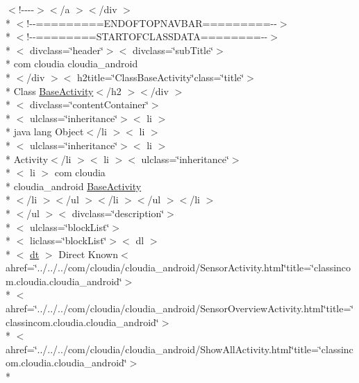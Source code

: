 \begin{DoxyCompactItemize}
$<$!-\/-\/-\/-\/$>$$<$/a $>$$<$/div $>$\\*
$<$!-\/-\/=========E\-N\-D\-O\-F\-T\-O\-P\-N\-A\-V\-B\-A\-R=========-\/-\/$>$\\*
$<$!-\/-\/========S\-T\-A\-R\-T\-O\-F\-C\-L\-A\-S\-S\-D\-A\-T\-A========-\/-\/$>$\\*
$<$ divclass=\char`\"{}header\char`\"{}$>$$<$ divclass=\char`\"{}sub\-Title\char`\"{}$>$\\*
 com cloudia cloudia\-\_\-android\\*
$<$/div $>$$<$ h2title=\char`\"{}Class\-Base\-Activity\char`\"{}class=\char`\"{}title\char`\"{}$>$\\*
 Class \hyperlink{index-2_8html_a61e95a6a9edfa0964ff3438abd1581e4}{Base\-Activity}$<$/h2 $>$$<$/div $>$\\*
$<$ divclass=\char`\"{}content\-Container\char`\"{}$>$\\*
$<$ ulclass=\char`\"{}inheritance\char`\"{}$>$$<$ li $>$\\*
 java lang Object$<$/li $>$$<$ li $>$\\*
$<$ ulclass=\char`\"{}inheritance\char`\"{}$>$$<$ li $>$\\*
 Activity$<$/li $>$$<$ li $>$$<$ ulclass=\char`\"{}inheritance\char`\"{}$>$\\*
$<$ li $>$ com cloudia \\*
cloudia\-\_\-android \hyperlink{index-2_8html_a61e95a6a9edfa0964ff3438abd1581e4}{Base\-Activity}\\*
$<$/li $>$$<$/ul $>$$<$/li $>$$<$/ul $>$$<$/li $>$\\*
$<$/ul $>$$<$ divclass=\char`\"{}description\char`\"{}$>$\\*
$<$ ulclass=\char`\"{}block\-List\char`\"{}$>$\\*
$<$ liclass=\char`\"{}block\-List\char`\"{}$>$$<$ dl $>$\\*
$<$ \hyperlink{stylesheet_8css_a107565fb4039d33b041380d6e0ea1d80}{dt} $>$ Direct Known$<$ ahref=\char`\"{}../../../com/cloudia/cloudia\-\_\-android/Sensor\-Activity.\-html\char`\"{}title=\char`\"{}classincom.\-cloudia.\-cloudia\-\_\-android\char`\"{}$>$\\*
$<$ ahref=\char`\"{}../../../com/cloudia/cloudia\-\_\-android/Sensor\-Overview\-Activity.\-html\char`\"{}title=\char`\"{}classincom.\-cloudia.\-cloudia\-\_\-android\char`\"{}$>$\\*
$<$ ahref=\char`\"{}../../../com/cloudia/cloudia\-\_\-android/Show\-All\-Activity.\-html\char`\"{}title=\char`\"{}classincom.\-cloudia.\-cloudia\-\_\-android\char`\"{}$>$\\*

\end{DoxyCompactItemize}

